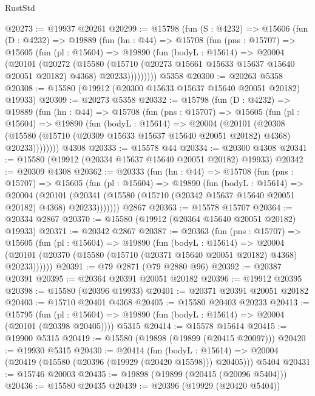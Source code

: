 \begin{lexlean}{RustStd}
\begin{coremodule}
@20273 := @19937 @20261
@20299 := @15798
    (fun (S : @4232) =>
    @15606
      (fun (D : @4232) =>
      @19889
        (fun (hn : @44) =>
        @15708
          (fun (pns : @15707) =>
          @15605
            (fun (pl : @15604) =>
            @19890
              (fun (bodyL : @15614) =>
              @20004
                (@20101
                  (@20272
                    (@15580
                      (@15710 (@20273 @15661 @15633 @15637 @15640 @20051 @20182) @4368)
                      @20233)))))))))
    @5358
@20300 := @20263 @5358
@20308 := @15580 (@19912 (@20300 @15633 @15637 @15640 @20051 @20182) @19933)
@20309 := @20273 @5358
@20332 := @15798
    (fun (D : @4232) =>
    @19889
      (fun (hn : @44) =>
      @15708
        (fun (pns : @15707) =>
        @15605
          (fun (pl : @15604) =>
          @19890
            (fun (bodyL : @15614) =>
            @20004
              (@20101
                (@20308
                  (@15580 (@15710 (@20309 @15633 @15637 @15640 @20051 @20182) @4368) @20233))))))))
    @4308
@20333 := @15578 @44
@20334 := @20300 @4308
@20341 := @15580 (@19912 (@20334 @15637 @15640 @20051 @20182) @19933)
@20342 := @20309 @4308
@20362 := @20333
    (fun (hn : @44) =>
    @15708
      (fun (pns : @15707) =>
      @15605
        (fun (pl : @15604) =>
        @19890
          (fun (bodyL : @15614) =>
          @20004
            (@20101
              (@20341 (@15580 (@15710 (@20342 @15637 @15640 @20051 @20182) @4368) @20233)))))))
    @2867
@20363 := @15578 @15707
@20364 := @20334 @2867
@20370 := @15580 (@19912 (@20364 @15640 @20051 @20182) @19933)
@20371 := @20342 @2867
@20387 := @20363
    (fun (pns : @15707) =>
    @15605
      (fun (pl : @15604) =>
      @19890
        (fun (bodyL : @15614) =>
        @20004 (@20101 (@20370 (@15580 (@15710 (@20371 @15640 @20051 @20182) @4368) @20233))))))
@20391 := @79 @2871 (@79 @2880 @96)
@20392 := @20387 @20391
@20395 := @20364 @20391 @20051 @20182
@20396 := @19912 @20395
@20398 := @15580 (@20396 @19933)
@20401 := @20371 @20391 @20051 @20182
@20403 := @15710 @20401 @4368
@20405 := @15580 @20403 @20233
@20413 := @15795
    (fun (pl : @15604) => @19890 (fun (bodyL : @15614) => @20004 (@20101 (@20398 @20405))))
    @5315
@20414 := @15578 @15614
@20415 := @19900 @5315
@20419 := @15580 (@19898 (@19899 (@20415 @20097)))
@20420 := @19930 @5315
@20430 := @20414
    (fun (bodyL : @15614) => @20004 (@20419 (@15580 (@20396 (@19929 (@20420 @15598))) @20405)))
    @5404
@20431 := @15746 @20003
@20435 := @19898 (@19899 (@20415 (@20096 @5404)))
@20436 := @15580 @20435
@20439 := @20396 (@19929 (@20420 @5404))

\end{coremodule}
\end{lexlean}
